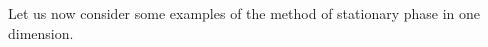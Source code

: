 \begin{comment}
  To complete the argument, we show that for sufficiently large $M$, we can treat $J$ as an error term. If we define
  \[ \psi_M(x,s) = \psi(x) (1 - s)^M R(x)^{M+1}, \]
  then
  \[ J(\lambda) = \int_{-\infty}^\infty \int_0^1 e^{\lambda i x^k} x^{(k+1)(M+1)} e^{\lambda i x^{k+1} R(x) s} \psi_M(x,s)\; dx\; ds. \]
  We introduce a bump function $\alpha$ such that $\alpha(x) = 1$ for $|x| \leq 1$, and vanishes outside for $|x| \geq 2$. For $\varepsilon > 0$, we write
  \begin{align*}
    J(\lambda) &= \int_{-\infty}^\infty \int_0^1 e^{\lambda i x^k} x^{(k+1)(M+1)} e^{\lambda i x^{k+1} R(x) s} \psi_M(x,s) \alpha(x/\varepsilon)\; dx\\
    &\ \ \ + \int_{-\infty}^\infty \int_0^1 e^{\lambda i x^k} x^{(k+1)(M+1)} e^{\lambda i x^{k+1} R(x) s} \psi_M(x,s) (1 - \alpha(x/\varepsilon))\; dx.
  \end{align*}
  The first integral is $O_{\psi,R,M}(\varepsilon^{(k+1)(M+1)+1})$. For the second, we employ an integration by parts in $x$. The value $e^{\lambda i x^k}$ is a fixed point of the differential operator $Df = f' / \lambda i x^{k-1}$, whose adjoint is
  \[ D^* g = \frac{d}{dx} \left( \frac{g}{\lambda i x^{k-1}} \right). \]
  For each $L$, there exists constants $c_n$ such that
  \[ (D^*)^L g = \frac{1}{\lambda^L} \sum_{n = 0}^L \frac{c_n g^{(n)}}{x^{Lk - n}}. \]
  If we write
  \[ g_n(\lambda,x,s) = \frac{1}{x^{Lk-n}} \frac{d^n}{dx^n} \left\{ x^{(k+1)(M+1)} e^{\lambda i x^{k+1} R(x) s} \psi(x,s) (1 - \alpha(x/\varepsilon)) \right\}, \]
  then our oscillatory integral is bounded by an implicit constant depending on $L$ and $k$, and
  \[ \sum_{n = 0}^L \frac{1}{\lambda^L} \int_{-\infty}^\infty \int_0^1 e^{\lambda i x^k} g_n(x)\; dx. \]
  Now $g_n$ has compact support depending on $\psi$, and vanishes for $|x| \leq \varepsilon$. For $|x| \geq \varepsilon$, we find that
  \[ |g_n(\lambda,x,s)| \lesssim_{L,M,k,\alpha,\psi,n} \sum_{m = 0}^n \lambda^m \varepsilon^{m-n} x^{n-Lk+(k+1)(M+1) + km}. \]
  Thus we conclude that for sufficiently large $L$
  \[ |J(\lambda)| \lesssim_{\psi,R,M,L,k,\alpha} \varepsilon^{(k+1)(M+1) + 1} \left( 1 + \varepsilon^{- Lk} \sum_{m = 0}^L \lambda^{m-L} \varepsilon^{(k+1)m} \right). \]
  TODO.
\end{proof}

\end{comment}

Let us now consider some examples of the method of stationary phase in one dimension.

